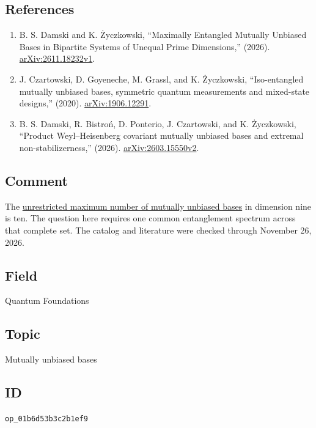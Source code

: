 \subsection*{References}

\begin{enumerate}[label={},leftmargin=4.8em,labelsep=0.5em]
  \footnotesize
  \item[\textup{[DZ26]}]\label{ref:d8-02-dz26}
  B. S. Damski and K. Życzkowski, ``Maximally Entangled Mutually Unbiased Bases in Bipartite Systems of Unequal Prime Dimensions,'' (2026). \href{https://arxiv.org/abs/2611.18232v1}{arXiv:2611.18232v1}.

  \item[\textup{[CGGZ20]}]\label{ref:d8-02-cggz20}
  J. Czartowski, D. Goyeneche, M. Grassl, and K. Życzkowski, ``Iso-entangled mutually unbiased bases, symmetric quantum measurements and mixed-state designs,'' (2020). \href{https://arxiv.org/abs/1906.12291}{arXiv:1906.12291}.

  \item[\textup{[DBPCZ26]}]\label{ref:d8-02-dbpcz26}
  B. S. Damski, R. Bistroń, D. Ponterio, J. Czartowski, and K. Życzkowski, ``Product Weyl--Heisenberg covariant mutually unbiased bases and extremal non-stabilizerness,'' (2026). \href{https://arxiv.org/abs/2603.15550v2}{arXiv:2603.15550v2}.
\end{enumerate}

\subsection*{Comment}

The \href{https://qiqc-op.com/problem/op_c9c62042b15fcb06/}{unrestricted maximum number of mutually unbiased bases} in dimension nine is ten. The question here requires one common entanglement spectrum across that complete set. The catalog and literature were checked through November 26, 2026.

\subsection*{Field}

Quantum Foundations

\subsection*{Topic}

Mutually unbiased bases

\subsection*{ID}

\texttt{op\_01b6d53b3c2b1ef9}
